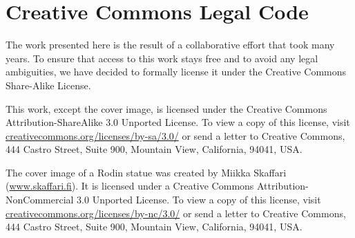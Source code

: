 \section{Creative Commons Legal Code}
\label{sec:cc}        

The work presented here is the result of a collaborative effort
that took many years.  To ensure that access to this work stays free
and to avoid any legal ambiguities, we have decided to formally license
it under the Creative Commons Share-Alike License.

This work, except the cover image, is licensed under the Creative Commons Attribution-ShareAlike 3.0 Unported License. To view a copy of this license, visit \href{https://creativecommons.org/licenses/by-sa/3.0/}{creative\-com\-mons.org/\-licenses/\-by-sa/3.0/} or send a letter to Creative Commons, 444 Castro Street, Suite 900, Mountain View, California, 94041, USA.

The cover image of a Rodin statue was created by Miikka Skaffari (\href{https://www.skaffari.fi/}{www.skaf\-fari.fi}).  It is licensed under a Creative Commons Attribution-NonCommercial 3.0 Unported License.  To view a copy of this license, visit \href{https://creativecommons.org/licenses/by-nc/3.0/}{creative\-com\-mons.org/\-licenses/\-by-nc/3.0/} or send a letter to Creative Commons, 444 Castro Street, Suite 900, Mountain View, California, 94041, USA.


